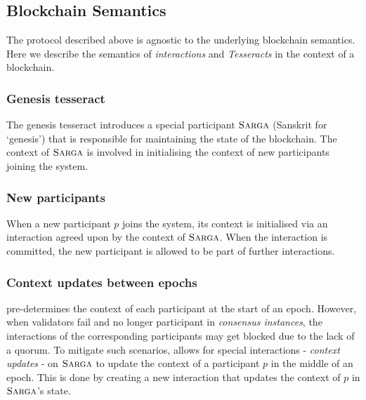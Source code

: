 \subsection{Blockchain Semantics}
\label{sec:blockchain} 

The protocol described above is agnostic to the underlying blockchain semantics. Here we describe the semantics of \emph{interactions} and \emph{Tesseracts} in the context of a blockchain.

\subsubsection{Genesis tesseract}

The genesis tesseract introduces a special participant $\mathrm{\textsc{Sarga}}$ (Sanskrit for `genesis') that is responsible for maintaining the state of the blockchain. The context of $\mathrm{\textsc{Sarga}}$ is involved in initialising the context of new participants joining the system. %

\subsubsection{New participants}

When a new participant $p$ joins the system, its context is initialised via an interaction agreed upon by the context of $\mathrm{\textsc{Sarga}}$.%
When the interaction is committed, the new participant is allowed to be part of further interactions.

\subsubsection{Context updates between epochs}

\codename{} pre-determines the context of each participant at the start of an epoch. However, when validators fail and no longer participant in \emph{consensus instances}, 
the interactions of the corresponding participants may get blocked due to the lack of a quorum. To mitigate such scenarios, \codename{} allows for special interactions - \emph{context updates} - on $\mathrm{\textsc{Sarga}}$ to update the context of a participant $p$ in the middle of an epoch. This is done by creating a new interaction that updates the context of $p$ in $\mathrm{\textsc{Sarga}}$'s state.


